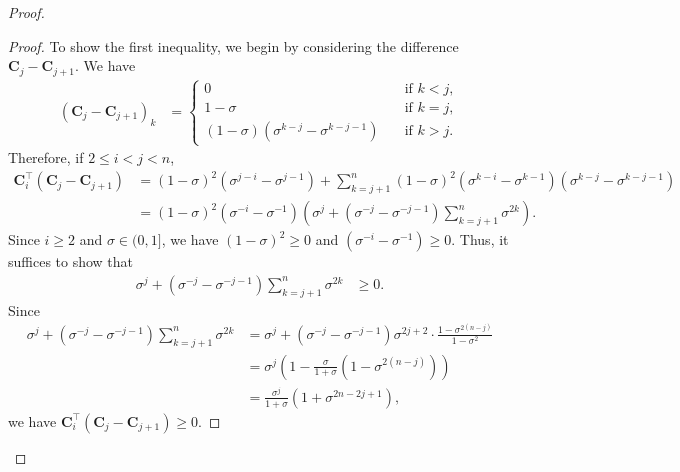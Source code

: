 \documentclass{article}
\theoremstyle{plain}
\theoremstyle{definition}
\theoremstyle{remark}
\def\bigopen#1{\left(#1\right)}
\def\mC{{\bm{C}}}
\begin{document}
\begin{proof}
\begin{proof}
    To show the first inequality, we begin by considering the difference $\mC_j - \mC_{j+1}$.
    We have
    \begin{align}
        (\mC_j - \mC_{j+1})_k &= 
        \begin{cases}
            0 &\quad \text{if } k < j, \\
            1-\sigma &\quad \text{if } k = j, \\
            (1-\sigma)(\sigma^{k-j} - \sigma^{k-j-1}) &\quad \text{if } k > j.
        \end{cases}
    \label{eq:cjdiff}
    \end{align}
    Therefore, if $2 \le i < j < n$, 
    \begin{align*}
        \mC_i^{\top} (\mC_j - \mC_{j+1}) &= (1-\sigma)^2(\sigma^{j-i} - \sigma^{j-1}) + \sum_{k=j+1}^n (1-\sigma)^2(\sigma^{k-i} - \sigma^{k-1})(\sigma^{k-j} - \sigma^{k-j-1})\\
        &= (1-\sigma)^2(\sigma^{-i} - \sigma^{-1}) \bigopen{\sigma^j +(\sigma^{-j} - \sigma^{-j-1})\sum_{k=j+1}^n \sigma^{2k}}.
    \end{align*}
    Since $i \ge 2$ and $\sigma\in (0, 1]$, we have $(1-\sigma)^2 \ge 0$ and $(\sigma^{-i}-\sigma^{-1}) \ge 0$. 
    Thus, it suffices to show that 
    \begin{align*}
        \sigma^j +(\sigma^{-j} - \sigma^{-j-1})\sum_{k=j+1}^n \sigma^{2k} &\ge 0.
    \end{align*}
    Since 
    \begin{align*}
        \sigma^j +(\sigma^{-j} - \sigma^{-j-1})\sum_{k=j+1}^n \sigma^{2k} &= \sigma^j +(\sigma^{-j} - \sigma^{-j-1}) \sigma^{2j+2} \cdot \frac{1-\sigma^{2(n-j)}}{1-\sigma^2} \\
        &= \sigma^j \bigopen{1 - \frac{\sigma}{1+\sigma}(1-\sigma^{2(n-j)})}\\
        &= \frac{\sigma^j}{1+\sigma} (1+\sigma^{2n-2j+1}),
    \end{align*}
    we have $\mC_i^{\top} (\mC_j - \mC_{j+1}) \ge 0$.


\end{proof}
\end{proof}
\end{document}
